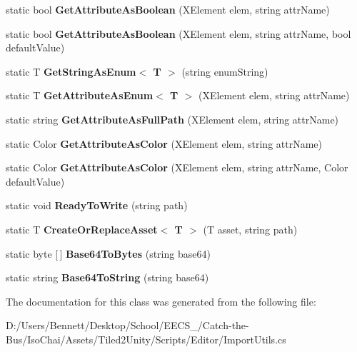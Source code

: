 \begin{DoxyCompactItemize}
static bool {\bfseries Get\+Attribute\+As\+Boolean} (X\+Element elem, string attr\+Name)
\item 
\mbox{\label{class_tiled2_unity_1_1_import_utils_a03cc67fb90080b345bcae6a3f4af6112}} 
static bool {\bfseries Get\+Attribute\+As\+Boolean} (X\+Element elem, string attr\+Name, bool default\+Value)
\item 
\mbox{\label{class_tiled2_unity_1_1_import_utils_a1bb629963e5bcce5b484d01463d79c47}} 
static T {\bfseries Get\+String\+As\+Enum$<$ T $>$} (string enum\+String)
\item 
\mbox{\label{class_tiled2_unity_1_1_import_utils_a13f4f397b11315cd4f235195985b694c}} 
static T {\bfseries Get\+Attribute\+As\+Enum$<$ T $>$} (X\+Element elem, string attr\+Name)
\item 
\mbox{\label{class_tiled2_unity_1_1_import_utils_aa49f3ec90727df791a864e99ac32ef60}} 
static string {\bfseries Get\+Attribute\+As\+Full\+Path} (X\+Element elem, string attr\+Name)
\item 
\mbox{\label{class_tiled2_unity_1_1_import_utils_a117905bc790ba993fb51f84ebf20d26a}} 
static Color {\bfseries Get\+Attribute\+As\+Color} (X\+Element elem, string attr\+Name)
\item 
\mbox{\label{class_tiled2_unity_1_1_import_utils_ae637054202cc20c1908d98d2b62e1927}} 
static Color {\bfseries Get\+Attribute\+As\+Color} (X\+Element elem, string attr\+Name, Color default\+Value)
\item 
\mbox{\label{class_tiled2_unity_1_1_import_utils_a11cec173605584ea154aaa5419a89234}} 
static void {\bfseries Ready\+To\+Write} (string path)
\item 
\mbox{\label{class_tiled2_unity_1_1_import_utils_a5e2d417ee1fb13a9e089c913752939ee}} 
static T {\bfseries Create\+Or\+Replace\+Asset$<$ T $>$} (T asset, string path)
\item 
\mbox{\label{class_tiled2_unity_1_1_import_utils_a1cc61166584f7ae7e358caf652cd4db7}} 
static byte \mbox{[}$\,$\mbox{]} {\bfseries Base64\+To\+Bytes} (string base64)
\item 
\mbox{\label{class_tiled2_unity_1_1_import_utils_a17abc9fcab7f46129163791fa9156b92}} 
static string {\bfseries Base64\+To\+String} (string base64)
\end{DoxyCompactItemize}


The documentation for this class was generated from the following file\+:\begin{DoxyCompactItemize}
\item 
D\+:/\+Users/\+Bennett/\+Desktop/\+School/\+E\+E\+C\+S\+\_/\+Catch-\/the-\/\+Bus/\+Iso\+Chai/\+Assets/\+Tiled2\+Unity/\+Scripts/\+Editor/Import\+Utils.\+cs\end{DoxyCompactItemize}
